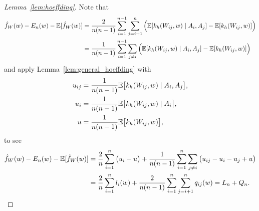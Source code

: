 \begin{proof}[Lemma~\ref{lem:hoeffding}]


  Note that
  \begin{align*}
    \hat f_W(w)
    - E_n(w)
    - \mathbb{E}[\hat f_W(w)]
    &=
    \frac{2}{n(n-1)}
    \sum_{i=1}^{n-1}
    \sum_{j=i+1}^{n}
    \Big(
    \mathbb{E}[k_h(W_{ij},w) \mid A_i, A_j]
    - \mathbb{E}[k_h(W_{ij},w)]
    \Big) \\
    &=
    \frac{1}{n(n-1)}
    \sum_{i=1}^{n-1}
    \sum_{j \neq i}
    \Big(
    \mathbb{E}[k_h(W_{ij},w) \mid A_i, A_j]
    - \mathbb{E}[k_h(W_{ij},w)]
    \Big)
  \end{align*}
  and apply Lemma~\ref{lem:general_hoeffding}
  with
  \begin{align*}
    u_{ij}
    &=
    \frac{1}{n(n-1)}
    \mathbb{E}\big[k_h(W_{ij},w) \mid A_i, A_j\big], \\
    u_i
    &=
    \frac{1}{n(n-1)}
    \mathbb{E}\big[k_h(W_{ij},w) \mid A_i\big], \\
    u
    &=
    \frac{1}{n(n-1)}
    \mathbb{E}\big[k_h(W_{ij},w)\big],
  \end{align*}
  to see
  \begin{align*}
    \hat f_W(w)
    - E_n(w)
    - \mathbb{E}[\hat f_W(w)]
    &=
    \frac{2}{n}
    \sum_{i=1}^n
    \big(u_i - u\big)
    + \frac{1}{n(n-1)}
    \sum_{i=1}^n
    \sum_{j \neq i}
    \big(
    u_{ij} - u_i - u_j + u
    \big) \\
    &=
    \frac{2}{n}
    \sum_{i=1}^n
    l_i(w)
    + \frac{2}{n(n-1)}
    \sum_{i=1}^n
    \sum_{j = i+1}^n
    q_{ij}(w)
    =
    L_n + Q_n.
  \end{align*}



\end{proof}
